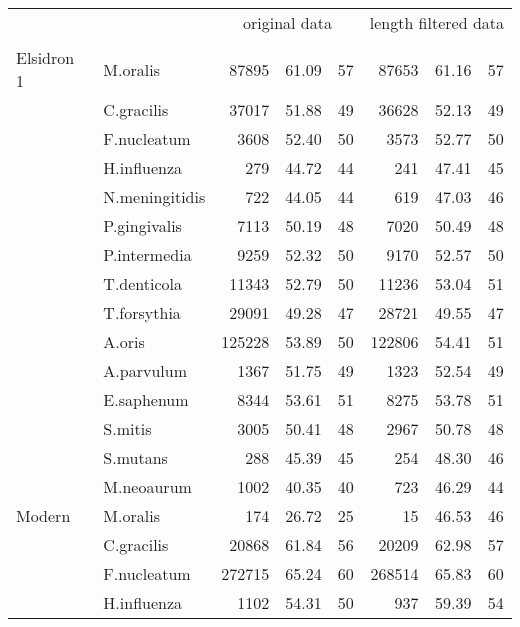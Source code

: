 \documentclass[12pt, a4paper]{article}
\renewcommand{\arraystretch}{1.2}
\newcommand{\ra}[1]{\renewcommand{\arraystretch}{#1}}
\begin{document}
{\begin{appendices}
\begin{table}[ht]
\centering\footnotesize
\ra{1.3}
\setlength{\tabcolsep}{6pt}
\begin{tabular}{@{}llrrcrrc@{}}
  \toprule
  & & \multicolumn{3}{c}{original data} & \multicolumn{3}{c}{length filtered data}\\
  \cmidrule(lr){3-5} \cmidrule(lr){6-8} 
	\thead{Sample} & \thead{Genome} & \thead{Reads} & \thead{Mean} & \thead{Median} & \thead{Reads} & \thead{Mean} & \thead{Median} \\ 
  \midrule
	Elsidron 1 & M.oralis & 87895 & 61.09 & 57 & 87653 & 61.16 & 57 \\ 
	 & C.gracilis & 37017 & 51.88 & 49 & 36628 & 52.13 & 49 \\ 
	 & F.nucleatum & 3608 & 52.40 & 50 & 3573 & 52.77 & 50 \\ 
	 & H.influenza & 279 & 44.72 & 44 & 241 & 47.41 & 45 \\ 
	 & N.meningitidis & 722 & 44.05 & 44 & 619 & 47.03 & 46 \\ 
	 & P.gingivalis & 7113 & 50.19 & 48 & 7020 & 50.49 & 48 \\ 
	 & P.intermedia & 9259 & 52.32 & 50 & 9170 & 52.57 & 50 \\ 
	 & T.denticola & 11343 & 52.79 & 50 & 11236 & 53.04 & 51 \\ 
	 & T.forsythia & 29091 & 49.28 & 47 & 28721 & 49.55 & 47 \\ 
	 & A.oris & 125228 & 53.89 & 50 & 122806 & 54.41 & 51 \\ 
	 & A.parvulum & 1367 & 51.75 & 49 & 1323 & 52.54 & 49 \\ 
	 & E.saphenum & 8344 & 53.61 & 51 & 8275 & 53.78 & 51 \\ 
	 & S.mitis & 3005 & 50.41 & 48 & 2967 & 50.78 & 48 \\ 
	 & S.mutans & 288 & 45.39 & 45 & 254 & 48.30 & 46 \\ 
	 & M.neoaurum & 1002 & 40.35 & 40 & 723 & 46.29 & 44 \\ 
	Modern & M.oralis & 174 & 26.72 & 25 &  15 & 46.53 & 46 \\ 
	 & C.gracilis & 20868 & 61.84 & 56 & 20209 & 62.98 & 57 \\ 
	 & F.nucleatum & 272715 & 65.24 & 60 & 268514 & 65.83 & 60 \\ 
	 & H.influenza & 1102 & 54.31 & 50 & 937 & 59.39 & 54 \\ 

\end{tabular}
\end{table}
\end{appendices}}
\end{document}
